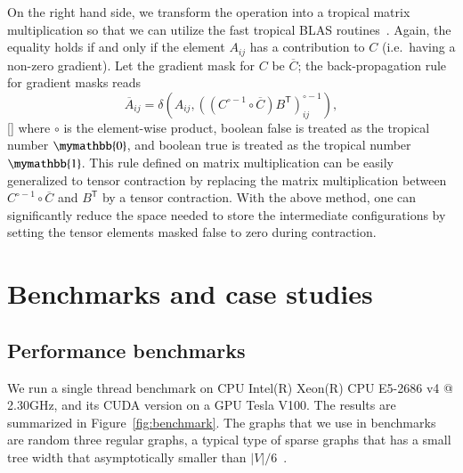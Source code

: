 \documentclass[onefignum, onetabnum]{siamart190516}
\newcommand{\<}{\langle}
\renewcommand{\>}{\rangle}
\newcommand{\green}[1]{[{\bf  \color{green}{XG: #1}}]}
\begin{document}
On the right hand side, we transform the operation into a tropical matrix multiplication so that we can utilize the fast tropical BLAS routines~\cite{TropicalGEMM}.
Again, the equality holds if and only if the element $A_{ij}$ has a contribution to $C$ (i.e.\ having a non-zero gradient).
Let the gradient mask for $C$ be $\overline C$; the back-propagation rule for gradient masks reads
\begin{equation}\label{eq:adrule}
\overline{A}_{ij} = \delta \left(A_{ij}, \left( \left( C^{\circ-1} \circ \overline C \right) B^{\mathsf{T}} \right)_{ij}^{\circ -1} \right),
\end{equation}
\green{explain delta}
where $\circ$ is the element-wise product, boolean false is treated as the tropical number $\mymathbb{0}$, and boolean true is treated as the tropical number $\mymathbb{1}$.
This rule defined on matrix multiplication can be easily generalized to tensor contraction by replacing the matrix multiplication between $C^{\circ-1} \circ \overline C$ and $B^{\mathsf{T}}$ by a tensor contraction.
With the above method, one can significantly reduce the space needed to store the intermediate configurations by setting the tensor elements masked false to zero during contraction.

\section{Benchmarks and case studies}
\subsection{Performance benchmarks}
We run a single thread benchmark on CPU Intel(R) Xeon(R) CPU E5-2686 v4 @ 2.30GHz,
and its CUDA version on a GPU Tesla V100.
The results are summarized in Figure~\ref{fig:benchmark}.
The graphs that we use in benchmarks are random three regular graphs,
 a typical type of sparse graphs that has a small tree width that asymptotically smaller than $|V|/6$~\cite{Fomin2006}.
\end{document}
